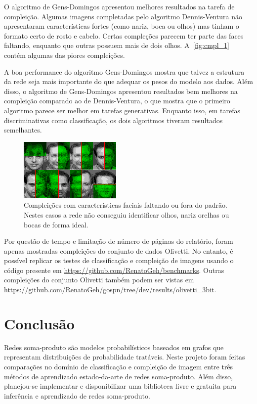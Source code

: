 \documentclass[12pt]{article}
\theoremstyle{plain}
\numberwithin{equation}{section}
\begin{document}
O algoritmo de Gens-Domingos apresentou melhores resultados na tarefa de compleição. Algumas
imagens completadas pelo algoritmo Dennis-Ventura não apresentaram características fortes (como
nariz, boca ou olhos) mas tinham o formato certo de rosto e cabelo. Certas compleções parecem ter
parte das faces faltando, enquanto que outras possuem mais de dois olhos. A~\autoref{fig:cmpl_1}
contém algumas das piores compleições.

A boa performance do algoritmo Gens-Domingos mostra que talvez a estrutura da rede seja mais
importante do que adequar os pesos do modelo aos dados. Além disso, o algoritmo de Gens-Domingos
apresentou resultados bem melhores na compleição comparado ao de Dennis-Ventura, o que mostra que o
primeiro algoritmo parece ser melhor em tarefas generativas. Enquanto isso, em tarefas
discriminativas como classificação, os dois algoritmos tiveram resultados semelhantes.

\begin{figure}[H]
  \centering\includegraphics[scale=2.5]{cmpl/notfine/notfine.png}
  \caption{Compleições com características faciais faltando ou fora do padrão. Nestes casos a rede
    não conseguiu identificar olhos, nariz orelhas ou bocas de forma ideal.\label{fig:cmpl_1}}
\end{figure}

Por questão de tempo e limitação de número de páginas do relatório, foram apenas mostradas
compleições do conjunto de dados Olivetti. No entanto, é possível replicar os testes de
classificação e compleição de imagens usando o código presente em
\url{https://github.com/RenatoGeh/benchmarks}. Outras compleições do conjunto Olivetti também podem
ser vistas em \url{https://github.com/RenatoGeh/gospn/tree/dev/results/olivetti_3bit}.

\section{Conclusão}

Redes soma-produto são modelos probabilísticos baseados em grafos que representam distribuições de
probabilidade tratáveis. Neste projeto foram feitas comparações no domínio de classificação e
compleição de imagem entre três métodos de aprendizado estado-da-arte de redes soma-produto. Além
disso, planejou-se implementar e disponibilizar uma biblioteca livre e gratuita para inferência e
aprendizado de redes soma-produto.
\end{document}
